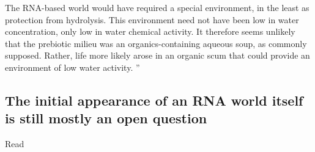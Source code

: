 \documentclass[12pt]{paper}
\begin{document}
The RNA-based world would have required a special
environment, in the least as protection from hydrolysis.
This environment need not have been low in water concentration, only low in water chemical 
activity. It therefore
seems unlikely that the prebiotic milieu was an organics-containing aqueous soup, as commonly 
supposed. Rather,
life more likely arose in an organic scum that could provide an environment of low water activity. 
''\cite{Pace1991} 

\subsection{The initial appearance of an RNA world itself is still mostly an open question }
Read \cite{Joyce2002a,Joyce1989,Penny2005,Anastasi2007}




  
   
\end{document}
